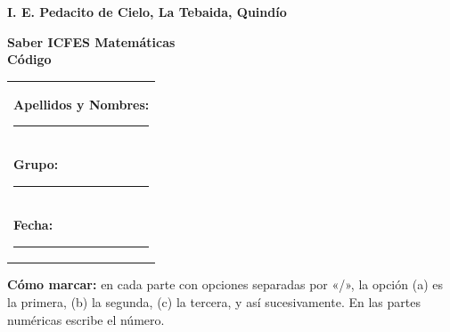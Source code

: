 \documentclass[10pt,a4paper]{article}
\makeatletter
\newcommand{\myID}{\@ID}
\newcommand{\myDate}{\@Date}
\makeatother
\begin{document}

\thispagestyle{empty}
{\sf
\textbf{\large{I. E. Pedacito de Cielo, La Tebaida, Quindío}}

\textbf{\large{Saber ICFES Matemáticas \myDate \hfill \\Código \myID}}

\vspace*{2cm}

\begin{tabular}{p{14cm}}
\textbf{Apellidos y Nombres:} \hrule \\[1.5cm]
\textbf{Grupo:} \hrule \\[1.5cm]
\textbf{Fecha:} \hrule  \\[1.5cm]
\end{tabular}

\vspace*{1cm}

\noindent\textbf{Cómo marcar:} en cada parte con opciones separadas por «/», la opción (a) es la primera, (b) la segunda, (c) la tercera, y así sucesivamente. En las partes numéricas escribe el número.

\vspace*{0.5cm}

}
\newpage

\begin{enumerate}


\end{enumerate}
\end{document}
